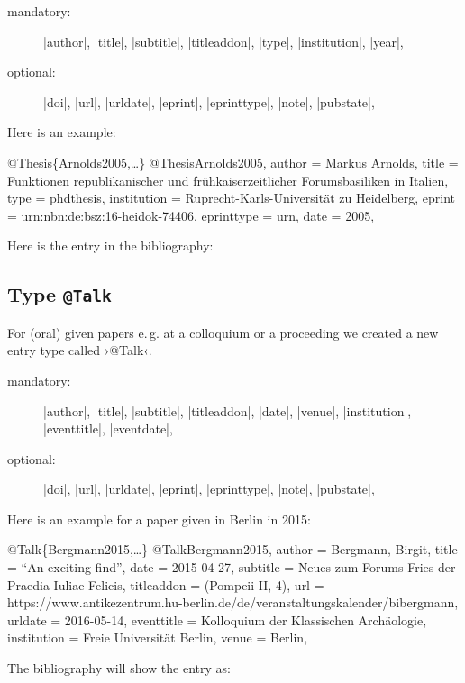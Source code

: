 \documentclass[a4paper,
10pt,
greek,
french,
spanish,
italian,
ngerman,
english
]{ltxdoc}
\begin{document}
\begin{description}
\item[mandatory:] 
|author|,
|title|, |subtitle|, |titleaddon|,
|type|, |institution|,
|year|,
\item[optional:]
|doi|, |url|, |urldate|, |eprint|, |eprinttype|, |note|, |pubstate|, 
 \end{description}
 

Here is an example:
\begin{bibexample}[label=Arnolds2005]{{@}Thesis\{Arnolds2005,…\}}
@Thesis{Arnolds2005,
  author      = {Markus Arnolds},
  title       = {Funktionen republikanischer und frühkaiserzeitlicher Forumsbasiliken in Italien},
  type        = {phdthesis},
  institution = {Ruprecht-Karls-Universität zu Heidelberg},
  eprint      = {urn:nbn:de:bsz:16-heidok-74406},
  eprinttype  = {urn},
  date        = {2005},
}
\end{bibexample}

Here is the entry in the bibliography:


 

 \subsection{Type \texttt{@Talk}}\label{talk}
For (oral) given papers e.\,g. at a colloquium or a proceeding we created a new entry type called ›@Talk‹.

\begin{description}
\item[mandatory:] 
|author|,
|title|, |subtitle|, |titleaddon|,
|date|,
|venue|,
|institution|,
|eventtitle|,
|eventdate|,
\item[optional:]
|doi|, |url|, |urldate|, |eprint|, |eprinttype|, |note|, |pubstate|, 
 \end{description}
 
Here is an example for a  paper  given in Berlin in 2015:
\begin{bibexample}[label=Bergmann2015]{{@}Talk\{Bergmann2015,…\}}
@Talk{Bergmann2015,
  author      = {Bergmann, Birgit},
  title       = {\enquote{An exciting find}},
  date        = {2015-04-27},
  subtitle    = {Neues zum Forums-Fries der Praedia Iuliae Felicis},
  titleaddon  = {(Pompeii II, 4)},
  url         = {https://www.antikezentrum.hu-berlin.de/de/veranstaltungskalender/bibergmann},
  urldate     = {2016-05-14},
  eventtitle  = {Kolloquium der Klassischen Archäologie},
  institution = {Freie Universität Berlin},
  venue       = Berlin,
}
\end{bibexample}
The bibliography will show the entry as:
\end{document}

